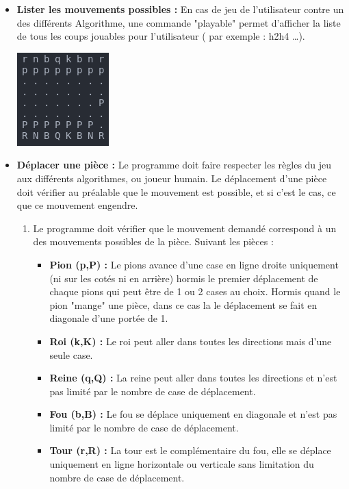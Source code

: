 \documentclass{article}
\begin{document}
\begin{itemize}
    \medskip
    \item \textbf{Lister les mouvements possibles : }
    \newline
    En cas de jeu de l'utilisateur contre un des différents Algorithme, une commande "playable" permet d'afficher la liste de tous les coups jouables pour l'utilisateur ( par exemple : h2h4 \dots).
    \newline
    \centerline{\includegraphics[scale = 0.5]{img/chess_moveh2h4.png}}
    \medskip
    \item \textbf{Déplacer une pièce : }
    \newline
    Le programme doit faire respecter les règles du jeu aux différents algorithmes, ou joueur humain.
    Le déplacement d'une pièce doit vérifier au préalable que le mouvement est possible, et si c'est le cas, ce que ce mouvement engendre.
    \begin{enumerate}
        \item Le programme doit vérifier que le mouvement demandé correspond à un des mouvements possibles de la pièce.
        Suivant les pièces : 
        \begin{itemize}
            \item \textbf{Pion (p,P) : } Le pions avance d'une case en ligne droite uniquement (ni sur les cotés ni en arrière) hormis le premier déplacement de chaque pions qui peut être de 1 ou 2 cases au choix.
            Hormis quand le pion "mange" une pièce, dans ce cas la le déplacement se fait en diagonale d'une portée de 1.
            \item \textbf{Roi (k,K) : } Le roi peut aller dans toutes les directions mais d'une seule case.
            \item \textbf{Reine (q,Q) : } La reine peut aller dans toutes les directions et n'est pas limité par le nombre de case de déplacement.
            \item \textbf{Fou (b,B) : } Le fou se déplace uniquement en diagonale et n'est pas limité par le nombre de case de déplacement.
            \item \textbf{Tour (r,R) : } La tour est le complémentaire du fou, elle se déplace uniquement en ligne horizontale ou verticale sans limitation du nombre de case de déplacement.

\end{itemize}
\end{enumerate}
\end{itemize}
\end{document}
